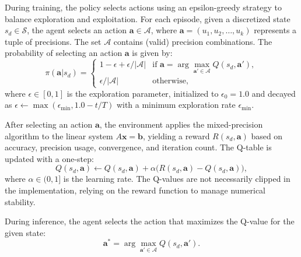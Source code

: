 \documentclass[Afour,sageh,times]{sagej}
\theoremstyle{plain}
\theoremstyle{definition}
\begin{document}
During training, the policy selects actions using an epsilon-greedy strategy to balance exploration and exploitation. For each episode, given a discretized state $s_d \in \mathcal{S}$, the agent selects an action $\mathbf{a} \in \mathcal{A}$, where $\mathbf{a} = (u_1, u_2, \ldots, u_k)$ represents a tuple of precisions. The set $\mathcal{A}$ contains (valid) precision combinations. The probability of selecting an action $\mathbf{a}$ is given by:
\begin{equation}
\pi(\mathbf{a} | s_d) =
\begin{cases}
1 - \epsilon + \epsilon / |\mathcal{A}| & \text{if } \mathbf{a} = \arg\max_{\mathbf{a}' \in \mathcal{A}} Q(s_d, \mathbf{a}'), \\
\epsilon / |\mathcal{A}| & \text{otherwise},
\end{cases}
\end{equation}
where $\epsilon \in [0, 1]$ is the exploration parameter, initialized to $\epsilon_0 = 1.0$ and decayed as $\epsilon \leftarrow \max(\epsilon_{\text{min}}, 1.0 - t / T)$ with a minimum exploration rate $\epsilon_{\text{min}}$.

After selecting an action $\mathbf{a}$, the environment applies the mixed-precision algorithm to the linear system $A \mathbf{x} = \mathbf{b}$, yielding a reward $R(s_d, \mathbf{a})$ based on accuracy, precision usage, convergence, and iteration count. The Q-table is updated with a one-step:
\begin{equation}
Q(s_d, \mathbf{a}) \leftarrow
Q(s_d, \mathbf{a}) + \alpha \Big( R(s_d, \mathbf{a}) - Q(s_d, \mathbf{a}) \Big),
\end{equation}
where $\alpha \in (0, 1]$ is the learning rate. The Q-values are not necessarily clipped in the implementation, relying on the reward function to manage numerical stability.

During inference, the agent selects the action that maximizes the Q-value for the given state:
\begin{equation}
\mathbf{a}^* = \arg\max_{\mathbf{a}' \in \mathcal{A}} Q(s_d, \mathbf{a}').
\end{equation}
\end{document}
